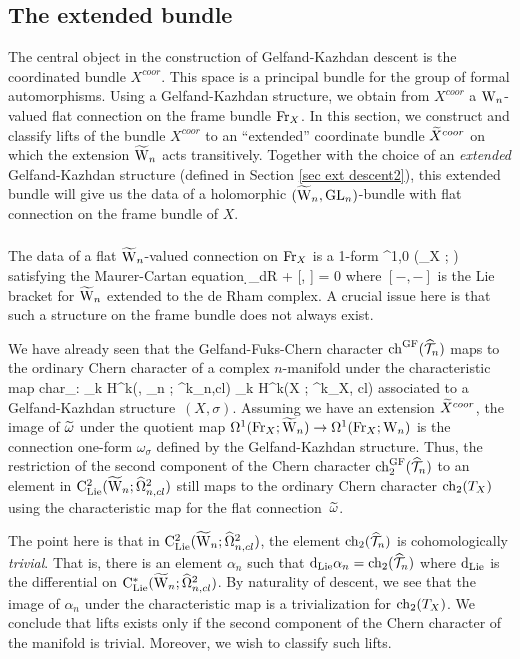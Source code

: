 \subsection{The extended bundle}
The central object in the construction of Gelfand-Kazhdan descent is the coordinated bundle $X^{coor}$. 
This space is a principal bundle for the group of formal automorphisms. 
Using a Gelfand-Kazhdan structure, we obtain from $X^{coor}$ a $\Vect$-valued flat connection on the frame bundle $\Fr_X$. 
In this section, we construct and classify lifts of the bundle $X^{coor}$ 
to an ``extended'' coordinate bundle $\Tilde{X}^{coor}$ on which the extension $\TVect$ acts transitively. 
Together with the choice of an {\em extended} Gelfand-Kazhdan structure (defined in Section \ref{sec ext descent2}), 
this extended bundle will give us the data of a holomorphic $(\TVect, \GL_n)$-bundle with flat connection on the frame bundle of $X$.

\subsubsection{} \label{otherway}
 
The data of a flat $\TVect$-valued connection on $\Fr_X$ is a 1-form
\ben
\Tilde{\omega} \in \Omega^{1,0} (\Fr_X ; \TVect)
\een
satisfying the Maurer-Cartan equation
\ben
\d_{dR} \Tilde{\omega} +  [\Tilde{\omega}, \Tilde{\omega}]
= 0
\een 
where $[-,-]$ is the Lie bracket for $\TVect$ extended to the de Rham complex. 
A crucial issue here is that such a structure on the frame bundle does not always exist.

We have already seen that the Gelfand-Fuks-Chern character
$\ch^\GF (\hT_n)$ maps to the ordinary Chern character of a complex
$n$-manifold under the characteristic map 
\ben
{\rm char}_\sigma : \bigoplus_k {\rm H}^k(\Vect , \GL_n ; \hOmega^k_{n,cl}) \to
\bigoplus_k {\rm H}^k(X ; \Omega^k_{X, cl}) 
\een  
associated to a Gelfand-Kazhdan structure~$(X, \sigma)$.
Assuming we have an extension  $\Tilde{X}^{coor}$,
the image of $\Tilde{\omega}$ under the quotient map 
$\Omega^1(\Fr_X ; \TVect) \to \Omega^1(\Fr_X ; \Vect)$ 
is the connection one-form $\omega_\sigma$ defined by the Gelfand-Kazhdan structure. 
Thus, the restriction of the second component of the Chern character $\ch_2^{\GF}(\hT_n)$ to
an element in $\clie^2(\TVect ; \hOmega^2_{n,cl})$ still maps to the
ordinary Chern character $\ch_2(T_X)$ using the characteristic map for
the flat connection~$\Tilde{\omega}$. 

The point here is that in $\clie^2(\TVect ; \hOmega^2_{n,cl})$, 
the element $\ch_2(\hT_n)$ is cohomologically {\em trivial}. 
That is, there
is an element $\alpha_n$ such that $\d_{\rm Lie} \alpha_n = \ch_2(\hT_n)$ where
$\d_{\rm Lie}$ is the differential on $\clie^*(\TVect ;
\hOmega^2_{n,cl})$. By naturality of descent, we see that the image of
$\alpha_n$ under the characteristic map is a trivialization for
$\ch_2(T_X)$. We conclude that lifts exists only if the second
component of the Chern character of
the manifold is trivial. Moreover, we wish to classify such lifts.

